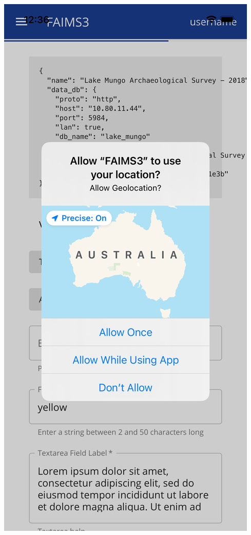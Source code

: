 \documentclass[
	aspectratio=169, %
	11pt, %
	t, %
]{beamer}
\begin{document}
\begin{frame}
\begin{columns}
\begin{column}{0.17\textwidth}
\begin{center}
\includegraphics[width=\textwidth]{Images/Simulator Screen Shot - iPhone 12 - 2021-05-12 at 12.36.55.png}
\end{center}
\end{column}
\end{columns}
\end{frame}
\end{document}
